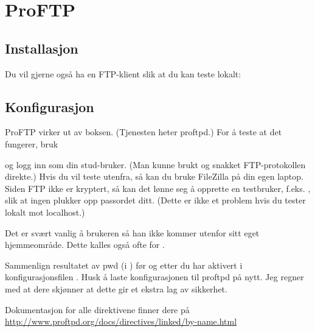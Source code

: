 \chapter{ProFTP} %

\section{Installasjon}


Du vil gjerne også ha en FTP-klient slik at du kan teste lokalt:


\section{Konfigurasjon}

ProFTP virker ut av boksen. (Tjenesten heter proftpd.) 
For å teste at det fungerer, bruk


og logg inn som din stud-bruker. (Man kunne brukt  og snakket 
FTP-protokollen direkte.) Hvis du vil teste utenfra, så kan du bruke
FileZilla på din egen laptop. Siden FTP ikke er kryptert, så kan det lønne
seg å opprette en testbruker, f.eks. , slik at ingen 
plukker opp passordet ditt. (Dette er ikke et problem hvis du tester lokalt 
mot localhost.)

Det er svært vanlig å  brukeren så han ikke kommer utenfor
sitt eget hjemmeområde. Dette kalles også ofte for . 

Sammenlign resultatet av pwd (i ) før og etter du har aktivert 
 i konfigurasjonsfilen . 
Husk å laste konfigurasjonen til proftpd på nytt. 
Jeg regner med at dere skjønner at dette gir et ekstra lag av sikkerhet.

Dokumentasjon for alle direktivene finner dere på\\
\url{http://www.proftpd.org/docs/directives/linked/by-name.html}